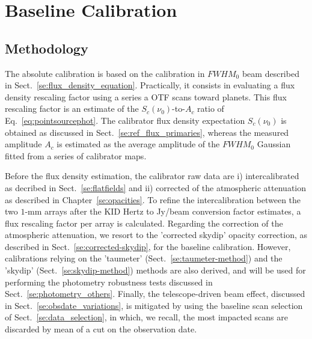 \section{Baseline Calibration}%
\label{se:baseline_calibration}

\subsection{Methodology}
\label{se:baseline_calibration_method}

The absolute calibration is based on the calibration in $FWHM_0$ beam
described in Sect.~\ref{se:flux_density_equation}. 
Practically, it consists in evaluating a flux
density rescaling factor using a series a OTF scans toward
planets. This flux rescaling factor is an estimate of the
$S_{c}(\nu_{0})$-to-$A_{c}$ ratio of Eq.~\ref{eq:pointsourcephot}. The
calibrator flux density expectation $S_{c}(\nu_{0})$ is obtained as
discussed in Sect.~\ref{se:ref_flux_primaries}, whereas the measured
amplitude $A_c$ is estimated as the average amplitude of the $FWHM_0$
Gaussian fitted from a series of calibrator maps.

Before the flux density estimation, the calibrator raw data are i)
intercalibrated as decribed in Sect.~\ref{se:flatfields} and ii) corrected of the
atmospheric attenuation as described in Chapter~\ref{se:opacities}. To
refine the intercalibration between the two $1$-mm arrays after the
KID Hertz to Jy/beam conversion factor estimates, a flux rescaling
factor per array is calculated. Regarding the correction of the
atmospheric attenuation, we
resort to the 'corrected skydip' opacity correction, as described in
Sect.~\ref{se:corrected-skydip}, for the baseline calibration.
However, calibrations relying on the
'taumeter' (Sect.~\ref{se:taumeter-method}) and the 'skydip'
(Sect.~\ref{se:skydip-method}) methods are also derived, and will be
used for performing the photometry robustness tests discussed in
Sect.~\ref{se:photometry_others}. Finally, the telescope-driven beam
effect, discussed in Sect.~\ref{se:obsdate_variations}, is mitigated by
using the baseline scan selection of
Sect.~\ref{se:data_selection}, in which, we recall, the most
impacted scans are discarded by mean of a cut on the observation
date. 

